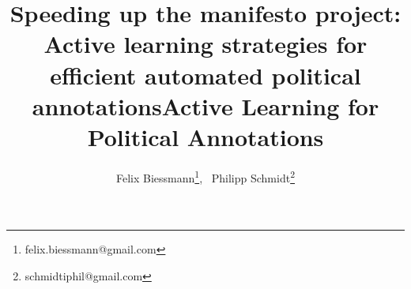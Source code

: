 \documentclass[runningheads,a4paper]{article}
\begin{document}

\title{Speeding up the manifesto project: Active learning strategies for efficient automated political annotations}

\title{Active Learning for Political Annotations}

%
%
\author{
Felix Biessmann\thanks{felix.biessmann@gmail.com},~ 
Philipp Schmidt\thanks{schmidtiphil@gmail.com}
}
%


%
%

\maketitle
\end{document}
